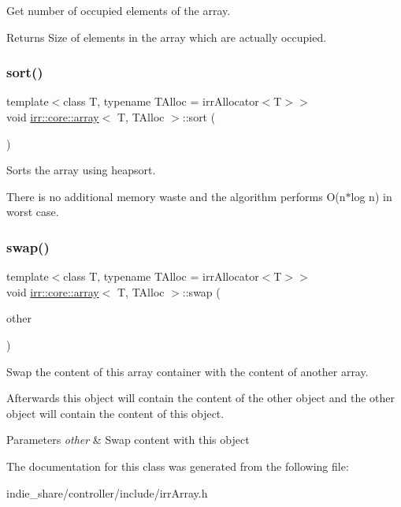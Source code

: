 Get number of occupied elements of the array. 

\begin{DoxyReturn}{Returns}
Size of elements in the array which are actually occupied. 
\end{DoxyReturn}
\mbox{\label{classirr_1_1core_1_1array_a870e52dd57dd67a9d59e5ca5f82bca94}} 
\subsubsection{\texorpdfstring{sort()}{sort()}}
{\footnotesize\ttfamily template$<$class T, typename T\+Alloc = irr\+Allocator$<$\+T$>$$>$ \\
void \hyperlink{classirr_1_1core_1_1array}{irr\+::core\+::array}$<$ T, T\+Alloc $>$\+::sort (\begin{DoxyParamCaption}{ }\end{DoxyParamCaption})\hspace{0.3cm}{\ttfamily [inline]}}



Sorts the array using heapsort. 

There is no additional memory waste and the algorithm performs O(n$\ast$log n) in worst case. \mbox{\label{classirr_1_1core_1_1array_a8857046f500a2990fc9930b204a3dbad}} 
\subsubsection{\texorpdfstring{swap()}{swap()}}
{\footnotesize\ttfamily template$<$class T, typename T\+Alloc = irr\+Allocator$<$\+T$>$$>$ \\
void \hyperlink{classirr_1_1core_1_1array}{irr\+::core\+::array}$<$ T, T\+Alloc $>$\+::swap (\begin{DoxyParamCaption}\item[{\hyperlink{classirr_1_1core_1_1array}{array}$<$ T, T\+Alloc $>$ \&}]{other }\end{DoxyParamCaption})\hspace{0.3cm}{\ttfamily [inline]}}



Swap the content of this array container with the content of another array. 

Afterwards this object will contain the content of the other object and the other object will contain the content of this object. 
\begin{DoxyParams}{Parameters}
{\em other} & Swap content with this object \\
\hline
\end{DoxyParams}


The documentation for this class was generated from the following file\+:\begin{DoxyCompactItemize}
\item 
indie\+\_\+share/controller/include/irr\+Array.\+h\end{DoxyCompactItemize}

